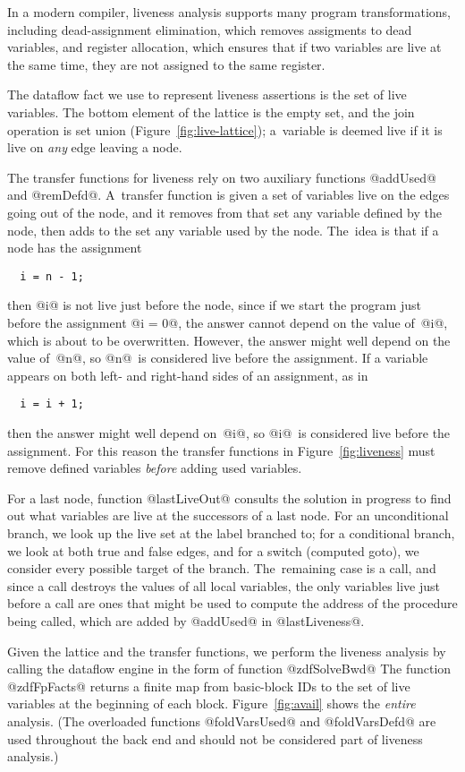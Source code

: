 \documentclass[blockstyle,preprint,nocopyrightspace]{sigplanconf}
\newcommand\figref[1]{Figure~\ref{fig:#1}}
\begin{document}
In a modern compiler, liveness analysis supports many program
transformations,
including
dead-assignment elimination,
which removes assigments to dead variables, 
and register allocation, which
ensures that if two variables are 
live at the same time, they are not assigned to the same register. 

The dataflow fact we use to represent liveness assertions is the set of
live variables.
The bottom element of the lattice is the empty set, and the join
operation is set union (\figref{live-lattice});
a~variable is deemed live if it is live on \emph{any} edge leaving a
node.

The transfer functions for liveness rely on two auxiliary functions
@addUsed@ and @remDefd@.
A~transfer function is given a set of variables live on the edges
going out of the node, and it removes from that set any variable
defined by the node, then adds to the set any variable used by the
node.
The~idea is that if a node has the assignment
\begin{verbatim}
  i = n - 1;
\end{verbatim}
then @i@ is not live just before the node, since if we start the
program just before the assignment @i = 0@, the answer cannot 
depend on the value of~@i@, which is about to be overwritten.
However, the answer might well depend on the value of~@n@, so
@n@~is considered live before the assignment.
If a variable appears on both left- and right-hand sides of an
assignment, as in
\begin{verbatim}
  i = i + 1;
\end{verbatim}
then the answer might well depend on~@i@, so @i@~is considered live
before the assignment.
For this reason the transfer functions in \figref{liveness} must
remove defined variables \emph{before} adding used variables.

For a last node, function @lastLiveOut@ consults the solution in
progress to find out what variables are live at the successors of a
last node. 
For an unconditional branch, we look up the live set at the label
branched to;
for a conditional branch, we look at both true and false edges, and
for a switch (computed goto), we consider every possible target of the
branch.
The~remaining case is a call, 
and since a call destroys the values of all local variables, the
only variables live just before a call are ones that might be used to
compute the address of the procedure being called, which are added by
@addUsed@ in @lastLiveness@.

Given the lattice and the transfer functions,
we perform the liveness analysis by calling
the dataflow engine in the form of function @zdfSolveBwd@
The function @zdfFpFacts@ returns 
a finite map from basic-block IDs to the set of live variables
at the beginning of each block.
\figref{avail} shows the \emph{entire} analysis.
(The overloaded functions
@foldVarsUsed@ and @foldVarsDefd@ are used throughout the back end and
should not be considered part of liveness analysis.)
\end{document}

